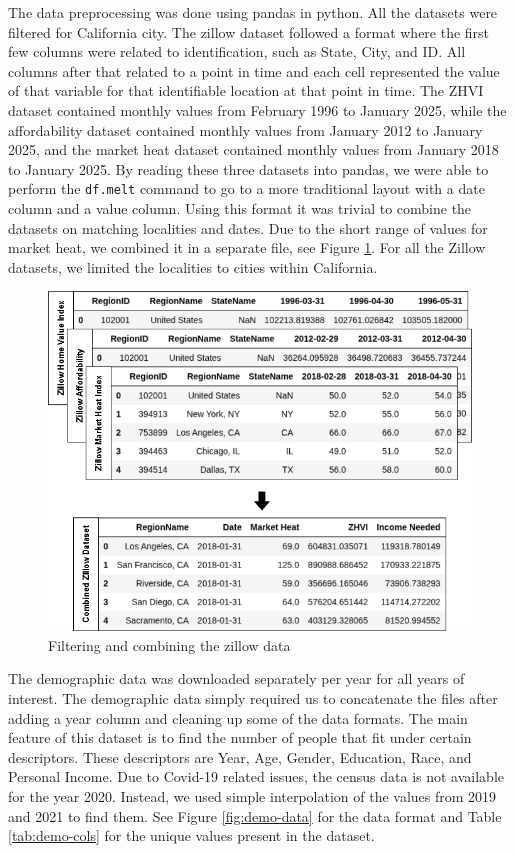 \documentclass[journal]{IEEEtran}
\begin{document}
The data preprocessing was done using pandas in python. All the datasets were
filtered for California city. The zillow dataset followed a format where the
first few columns were related to identification, such as State, City, and ID.
All columns after that related to a point in time and each cell represented the
value of that variable for that identifiable location at that point in time.
The ZHVI dataset contained monthly values from February 1996 to January 2025,
while the affordability dataset contained monthly values from January 2012 to
January 2025, and the market heat dataset contained monthly values from January
2018 to January 2025. By reading these three datasets into pandas, we were able
to perform the \lstinline{df.melt} command to go to a more traditional layout
with a date column and a value column. Using this format it was trivial to
combine the datasets on matching localities and dates. Due to the short range
of values for market heat, we combined it in a separate file, see Figure
\ref{fig:zillow-data}. For all the Zillow datasets, we limited the localities
to cities within California.

\begin{figure}[!htb]
	\centering
	\includegraphics[width=\linewidth]{dataset-conversion.drawio.png}
	\caption{Filtering and combining the zillow data}
	\label{fig:zillow-data}
\end{figure}

The demographic data was downloaded separately per year for all years of
interest. The demographic data simply required us to concatenate the files
after adding a year column and cleaning up some of the data formats. The main
feature of this dataset is to find the number of people that fit under certain
descriptors. These descriptors are Year, Age, Gender, Education, Race, and
Personal Income. Due to Covid-19 related issues, the census data is not
available for the year 2020. Instead, we used simple interpolation of the
values from 2019 and 2021 to find them. See Figure \ref{fig:demo-data} for the
data format and Table \ref{tab:demo-cols} for the unique values present in the
dataset.
\end{document}

